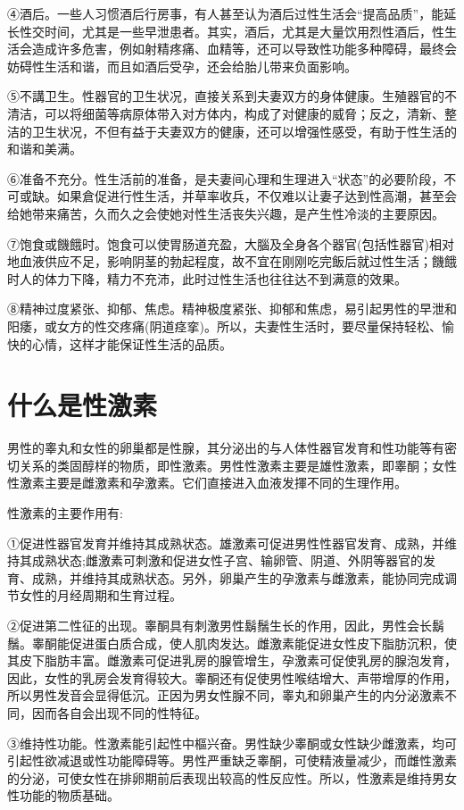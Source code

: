 \documentclass[12pt,UTF8]{ctexbook}
\begin{document}
④酒后。一些人习惯酒后行房事，有人甚至认为酒后过性生活会“提高品质”，能延长性交时间，尤其是一些早泄患者。其实，酒后，尤其是大量饮用烈性酒后，性生活会造成许多危害，例如射精疼痛、血精等，还可以导致性功能多种障碍，最终会妨碍性生活和谐，而且如酒后受孕，还会给胎儿带来负面影响。

⑤不講卫生。性器官的卫生状况，直接关系到夫妻双方的身体健康。生殖器官的不清洁，可以将细菌等病原体带入对方体内，构成了对健康的威脅；反之，清新、整洁的卫生状况，不但有益于夫妻双方的健康，还可以增强性感受，有助于性生活的和谐和美满。

⑥准备不充分。性生活前的准备，是夫妻间心理和生理进入“状态”的必要阶段，不可或缺。如果倉促进行性生活，并草率收兵，不仅难以让妻子达到性高潮，甚至会给她带来痛苦，久而久之会使她对性生活丧失兴趣，是产生性冷淡的主要原因。

⑦饱食或饑餓时。饱食可以使胃肠道充盈，大腦及全身各个器官(包括性器官)相对地血液供应不足，影响阴茎的勃起程度，故不宜在刚刚吃完飯后就过性生活；饑餓时人的体力下降，精力不充沛，此时过性生活也往往达不到满意的效果。

⑧精神过度紧张、抑郁、焦虑。精神极度紧张、抑郁和焦虑，易引起男性的早泄和阳痿，或女方的性交疼痛(阴道痉挛)。所以，夫妻性生活时，要尽量保持轻松、愉快的心情，这样才能保证性生活的品质。

\section{什么是性激素}

男性的睾丸和女性的卵巢都是性腺，其分泌出的与人体性器官发育和性功能等有密切关系的类固醇样的物质，即性激素。男性性激素主要是雄性激素，即睾酮；女性性激素主要是雌激素和孕激素。它们直接进入血液发揮不同的生理作用。

性激素的主要作用有:

①促进性器官发育并维持其成熟状态。雄激素可促进男性性器官发育、成熟，并维持其成熟状态;雌激素可刺激和促进女性子宫、输卵管、阴道、外阴等器官的发育、成熟，并维持其成熟状态。另外，卵巢产生的孕激素与雌激素，能协同完成调节女性的月经周期和生育过程。

②促进第二性征的出现。睾酮具有刺激男性鬍鬚生长的作用，因此，男性会长鬍鬚。睾酮能促进蛋白质合成，使人肌肉发达。雌激素能促进女性皮下脂肪沉积，使其皮下脂肪丰富。雌激素可促进乳房的腺管增生，孕激素可促使乳房的腺泡发育，因此，女性的乳房会发育得较大。睾酮还有促使男性喉结增大、声带增厚的作用，所以男性发音会显得低沉。正因为男女性腺不同，睾丸和卵巢产生的内分泌激素不同，因而各自会出现不同的性特征。

③维持性功能。性激素能引起性中樞兴奋。男性缺少睾酮或女性缺少雌激素，均可引起性欲减退或性功能障碍等。男性严重缺乏睾酮，可使精液量减少，而雌性激素的分泌，可使女性在排卵期前后表现出较高的性反应性。所以，性激素是维持男女性功能的物质基础。
\end{document}
